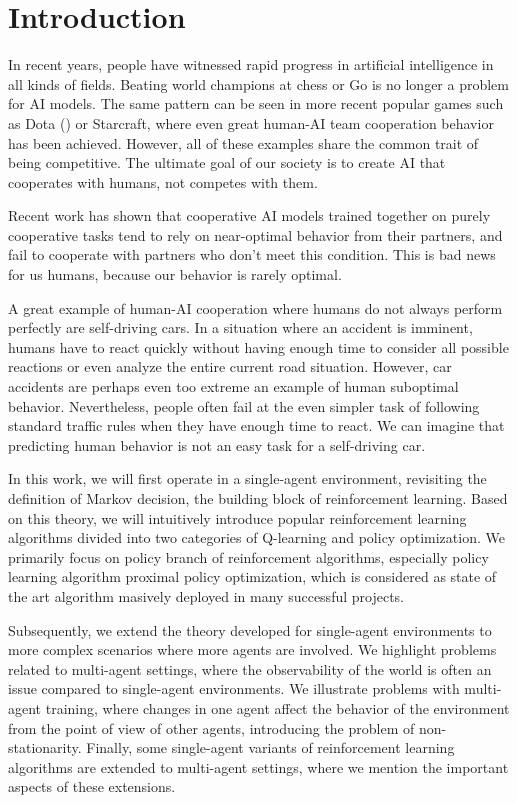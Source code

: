\chapter*{Introduction}

In recent years, people have witnessed rapid progress in artificial intelligence in all kinds of fields. 
Beating world champions at chess or Go is no longer a problem for AI models. 
The same pattern can be seen in more recent popular games such as Dota (\cite{DotaOpenFive}) or Starcraft, where even great human-AI team cooperation behavior has been achieved.
However, all of these examples share the common trait of being competitive.
The ultimate goal of our society is to create AI that cooperates with humans, not competes with them.

Recent work has shown that cooperative AI models trained together on purely cooperative tasks tend to rely on near-optimal behavior from their partners, and fail to cooperate with partners who don't meet this condition.
This is bad news for us humans, because our behavior is rarely optimal.

A great example of human-AI cooperation where humans do not always perform perfectly are self-driving cars. 
In a situation where an accident is imminent, humans have to react quickly without having enough time to consider all possible reactions or even analyze the entire current road situation.
However, car accidents are perhaps even too extreme an example of human suboptimal behavior. 
Nevertheless, people often fail at the even simpler task of following standard traffic rules when they have enough time to react.
We can imagine that predicting human behavior is not an easy task for a self-driving car.

In this work, we will first operate in a single-agent environment, revisiting the definition of Markov decision, the building block of reinforcement learning.
Based on this theory, we will intuitively introduce popular reinforcement learning algorithms divided into two categories of Q-learning and policy optimization.
We primarily focus on policy branch of reinforcement algorithms, especially policy learning algorithm proximal policy optimization, which is considered as state of the art algorithm masively deployed in many successful projects.

Subsequently, we extend the theory developed for single-agent environments to more complex scenarios where more agents are involved.
We highlight problems related to multi-agent settings, where the observability of the world is often an issue compared to single-agent environments.
We illustrate problems with multi-agent training, where changes in one agent affect the behavior of the environment from the point of view of other agents, introducing the problem of non-stationarity.
Finally, some single-agent variants of reinforcement learning algorithms are extended to multi-agent settings, where we mention the important aspects of these extensions.


